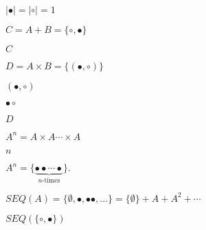 \documentclass[10pt]{book}
\begin{document}
\begin{mdSnippets}
\begin{mdInlineSnippet}[9890ec52a31052b345e3e7e4ae967df6]%
$|\bullet|=|\circ|=1$\end{mdInlineSnippet}%
\begin{mdInlineSnippet}[6d1c93504c1872dc0b12085290187078]%
$C = A+B = \{\circ, \bullet\}$\end{mdInlineSnippet}%
\begin{mdInlineSnippet}[0d61f8370cad1d412f80b84d143e1257]%
$C$\end{mdInlineSnippet}%
\begin{mdInlineSnippet}[23a03cfc484e1a7ba5d9895fa92211dc]%
$D = A\times B = \{(\bullet,\circ)\}$\end{mdInlineSnippet}%
\begin{mdInlineSnippet}[1160cc1178ec8a6c00a07350e8341957]%
$(\bullet,\circ)$\end{mdInlineSnippet}%
\begin{mdInlineSnippet}[c6cb23d9b364d9f46a407923dd42a0b0]%
$\bullet\circ$\end{mdInlineSnippet}%
\begin{mdInlineSnippet}[f623e75af30e62bbd73d6df5b50bb7b5]%
$D$\end{mdInlineSnippet}%
\begin{mdInlineSnippet}%
$A^n = A\times A \cdots \times A$\end{mdInlineSnippet}%
\begin{mdInlineSnippet}[7b8b965ad4bca0e41ab51de7b31363a1]%
$n$\end{mdInlineSnippet}%
\begin{mdInlineSnippet}[2e07a12773ece05d1e72f5791c9df5fd]%
$A^n=\{\underbrace{\bullet\bullet\cdots\bullet}_{n\text{-times}}\}.$\end{mdInlineSnippet}%
\begin{mdInlineSnippet}[1482e22537fdc1c3ad506ab5a015b7d8]%
$SEQ(A)=\{\emptyset, \bullet, \bullet\bullet,\ldots\}=\{\emptyset\}+A+A^2+\cdots$\end{mdInlineSnippet}%
\begin{mdInlineSnippet}%
$SEQ(\{\circ,\bullet\})$\end{mdInlineSnippet}%

\end{mdSnippets}
\end{document}
